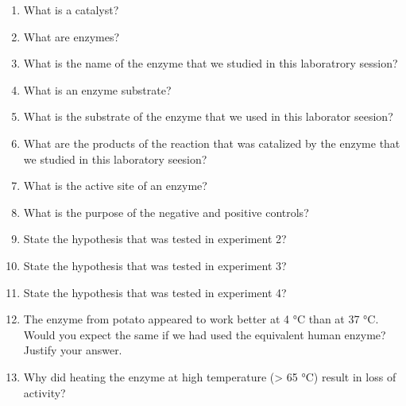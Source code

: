 \begin{enumerate}
\def\labelenumi{\arabic{enumi}.}
\tightlist
\item
  What is a catalyst?
\item
  What are enzymes?
\item
  What is the name of the enzyme that we studied in this laboratrory
  session?
\item
  What is an enzyme substrate?
\item
  What is the substrate of the enzyme that we used in this laborator
  seesion?
\item
  What are the products of the reaction that was catalized by the enzyme
  that we studied in this laboratory seesion?
\item
  What is the active site of an enzyme?
\item
  What is the purpose of the negative and positive controls?
\item
  State the hypothesis that was tested in experiment 2?
\item
  State the hypothesis that was tested in experiment 3?
\item
  State the hypothesis that was tested in experiment 4?
\item
  The enzyme from potato appeared to work better at 4 °C than at 37 °C.
  Would you expect the same if we had used the equivalent human enzyme?
  Justify your answer.
\item
  Why did heating the enzyme at high temperature (\textgreater{} 65 °C)
  result in loss of activity?
\end{enumerate}



